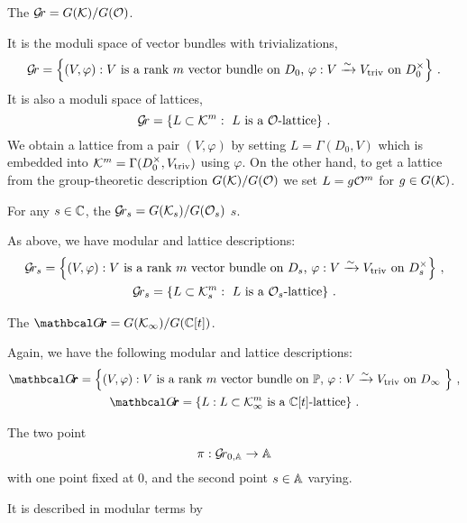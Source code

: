 \documentclass{article}
\begin{document}
\begin{definition}
\label{def:gr}
     The  $\Gr = G(\cK)/G(\cO)$.
\end{definition}    
It is the moduli space of vector bundles with trivializations,
$$
\Gr = 
    \left\{ 
        (V, \varphi) : \text{$V$ is a rank $m$ vector bundle on $ D_0 $, $\varphi : V \xrightarrow{\sim} \Vtriv $ on $ D_0^\times $} 
    \right\} \,. 
$$
It is also a moduli space of lattices, 
$$ 
\Gr = 
    \left\{ L \subset \cK^m : \text{ $L$ is a $\cO$-lattice} \right\}\,.
$$
We obtain a lattice from a pair $ (V,\varphi) $ by setting $ L = \Gamma(D_0, V)$ which is embedded into $ \cK^m = \Gamma(D_0^\times, \Vtriv)$ using $ \varphi$.  
On the other hand, to get a lattice from the group-theoretic description $ G(\cK) / G(\cO) $ we set $ L = g \cO^m$ for $ g \in G(\cK)$.
% 
\begin{definition}
\label{def:grs}
    For any $ s \in \CC $, the  $\Gr_s = G(\cK_s)/G(\cO_s)$  $ s $. 
\end{definition}  
% 
As above, we have modular and lattice descriptions:
% 
\begin{gather*}
\Gr_s = 
    \left\{ (
        V, \varphi) : \text{$V$ is a rank $m$ vector bundle on $ D_s $, $\varphi : V \xrightarrow{\sim} \Vtriv $ on $ D^\times_s $} 
    \right\}\,, \\
\Gr_s = 
    \left\{ 
        L \subset \cK_s^m : \text{ $L$ is a $\cO_s$-lattice} 
    \right\} \,. 
\end{gather*}
% 
\begin{definition}
\label{def:grth}
    The  $\Grth = G(\Kinf)/G(\CC[t])$.
\end{definition}
Again, we have the following modular and lattice descriptions:
\begin{gather*}
\Grth = 
    \left\{ 
        (V, \varphi) : \text{$V$ is a rank $m$ vector bundle on $ \PP $, $\varphi : V \xrightarrow{\sim} \Vtriv $ on $ D_\infty $ } 
    \right\}\,, \\
\Grth = 
    \left\{ 
        L : L \subset  \Kinf^m \text{ is a $\CC[t]$-lattice} 
    \right\}\,.
\end{gather*}
% 
\begin{definition} 
\label{def:bdgr}
    The two point  $$\pi : \Grbd\to \AA$$ with one point fixed at 0, and the second point $s\in\AA$ varying.
\end{definition}
% 
It is described in modular terms by 
\end{document}

